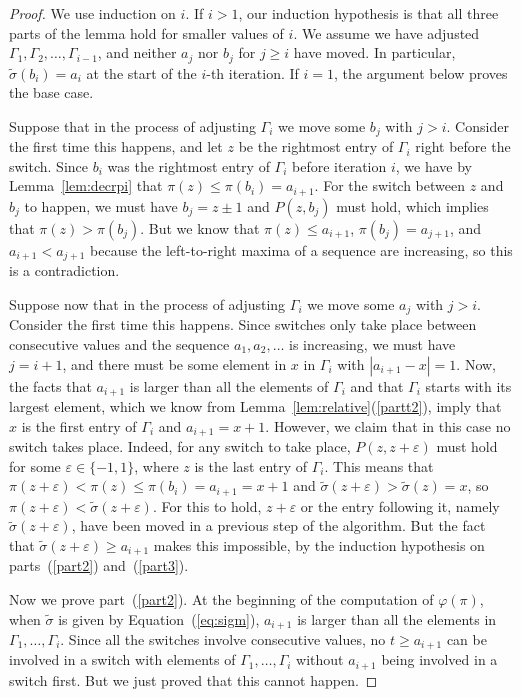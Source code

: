 \documentclass[11pt]{amsart}
\newcommand\wt{\widetilde}
\newcommand\bij{\varphi}
\newcommand\eps{\varepsilon}
\newcommand\sigm{\wt\sigma}
\begin{document}
\begin{proof}
We use induction on $i$. If $i>1$, our induction hypothesis is that all three parts of the lemma hold for smaller values of $i$.
We assume we have adjusted $\Gamma_1,\Gamma_2,\dots,\Gamma_{i-1}$, and neither $a_j$ nor $b_j$ for $j\ge i$ have moved.
In particular, $\sigm(b_i)=a_i$ at the start of the $i$-th iteration. If $i=1$, the argument below proves the base case.

Suppose that in the process of adjusting $\Gamma_i$ we move some $b_j$ with $j>i$. Consider the first time this happens,
and let $z$ be the rightmost entry of $\Gamma_i$ right before the switch. Since $b_i$ was the rightmost entry of $\Gamma_i$ before iteration $i$,
we have by Lemma~\ref{lem:decrpi} that $\pi(z)\le\pi(b_i)=a_{i+1}$.
For the switch between $z$ and $b_j$ to happen, we must have $b_j=z\pm1$ and $P(z,b_j)$ must hold,
which implies that $\pi(z)>\pi(b_j)$.  But we know that $\pi(z)\le a_{i+1}$, $\pi(b_j)=a_{j+1}$, and $a_{i+1}<a_{j+1}$
because the left-to-right maxima of a sequence are increasing, so this is a contradiction.

Suppose now that in the process of adjusting $\Gamma_i$ we move some $a_j$ with $j>i$.
Consider the first time this happens. Since switches only take
place between consecutive values and the sequence  $a_1,a_2,\dots$ is increasing, we must have $j=i+1$, and there must be some element in $x$ in $\Gamma_i$ with $|a_{i+1}-x|=1$.
Now, the facts that $a_{i+1}$ is larger than all the elements of $\Gamma_i$ and that $\Gamma_i$ starts with its largest element,
which we know from Lemma~\ref{lem:relative}(\ref{partt2}), imply that $x$ is the first entry of $\Gamma_i$ and $a_{i+1}=x+1$. However, we claim that in this case no switch
takes place. Indeed, for any switch to take place, $P(z,z+\eps)$ must hold for some $\eps\in\{-1,1\}$, where $z$ is the last entry of $\Gamma_i$. This means that
$\pi(z+\eps)<\pi(z)\le\pi(b_i)=a_{i+1}=x+1$ and $\sigm(z+\eps)>\sigm(z)=x$, so $\pi(z+\eps)<\sigm(z+\eps)$. For this to hold,
$z+\eps$ or the entry following it, namely $\sigm(z+\eps)$, have been moved in a previous step of the algorithm. But the fact that $\sigm(z+\eps)\ge a_{i+1}$ makes this impossible, by the induction hypothesis on parts~(\ref{part2}) and~(\ref{part3}).

Now we prove part~(\ref{part2}). At the beginning of the computation of $\bij(\pi)$, when $\sigm$ is given by Equation~(\ref{eq:sigm}), $a_{i+1}$ is larger than all the elements in $\Gamma_1,\dots,\Gamma_i$. Since all the switches involve
consecutive values, no $t\ge a_{i+1}$ can be involved in a switch with elements of $\Gamma_1,\dots,\Gamma_i$ without $a_{i+1}$ being involved in a switch first. But we just proved that this cannot happen.


\end{proof}
\end{document}
